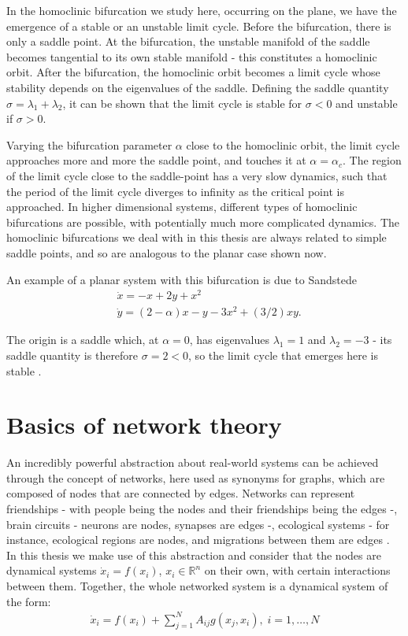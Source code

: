 In the homoclinic bifurcation we study here, occurring on the plane, we have the emergence of a stable or an unstable limit cycle. Before the bifurcation, there is only a saddle point. At the bifurcation, the unstable manifold of the saddle becomes tangential to its own stable manifold - this constitutes a homoclinic orbit. After the bifurcation, the homoclinic orbit becomes a limit cycle whose stability depends on the eigenvalues of the saddle. Defining the saddle quantity $\sigma = \lambda_1 + \lambda_2$, it can be shown \cite{kuznetsov} that the limit cycle is stable for $\sigma < 0$ and unstable if $\sigma > 0$. 

Varying the bifurcation parameter $\alpha$ close to the homoclinic orbit, the limit cycle approaches more and more the saddle point, and touches it at $\alpha = \alpha_c$. The region of the limit cycle close to the saddle-point has a very slow dynamics, such that the period of the limit cycle diverges to infinity as the critical point is approached. In higher dimensional systems, different types of homoclinic bifurcations are possible, with potentially much more complicated dynamics. The homoclinic bifurcations we deal with in this thesis are always related to simple saddle points, and so are analogous to the planar case shown now. 

An example of a planar system with this bifurcation is due to Sandstede \cite{sandstede1997constructing}
%
\begin{align}
    &\dot{x} = -x + 2y + x^2  \\ 
    &\dot{y} = (2-\alpha)x - y - 3x^2 + (3/2)xy.
    \label{eq:sandstede}
\end{align}

The origin is a saddle which, at $\alpha=0$, has eigenvalues $\lambda_1 =1$ and $\lambda_2 = -3$ - its saddle quantity is therefore $\sigma = 2 < 0$, so the limit cycle that emerges here is stable \cite{kuznetsov}.


\section{Basics of network theory}\label{method:sec:network}
An incredibly powerful abstraction about real-world systems can be achieved through the concept of networks, here used as synonyms for graphs, which are composed of nodes that are connected by edges. Networks can represent friendships - with people being the nodes and their friendships being the edges -, brain circuits - neurons are nodes, synapses are edges \cite{bullmore2009complex} -, ecological systems - for instance, ecological regions are nodes, and migrations between them are edges \cite{landi2018complexity}. In this thesis we make use of this abstraction and consider that the nodes are dynamical systems $\dot{x}_i = f(x_i)$, $x_i \in \mathbb{R}^n$ on their own, with certain interactions between them. Together, the whole networked system is a dynamical system of the form:
%
\begin{align}
    \dot{x}_i = f(x_i) + \sum_{j=1}^N A_{ij} g(x_j, x_i),\; i=1,\ldots,N
    \label{eq:network-general}
\end{align} 

